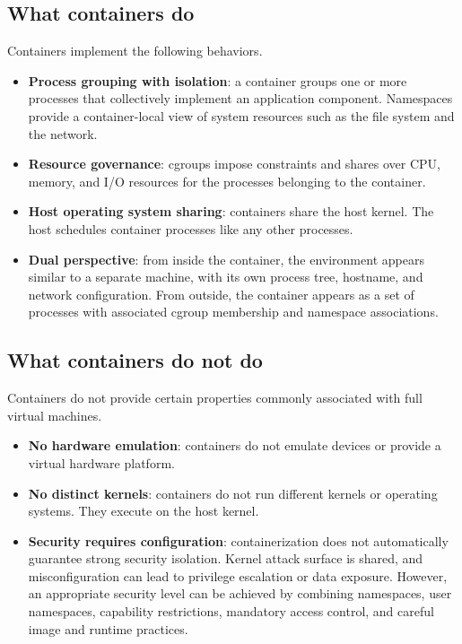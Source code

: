 \documentclass[11pt,a4paper,openany]{report}
\begin{document}
\subsection{What containers do}

Containers implement the following behaviors.

\begin{itemize}
\item \textbf{Process grouping with isolation}: a container groups one or more processes that collectively implement an application component. Namespaces provide a container-local view of system resources such as the file system and the network.
\item \textbf{Resource governance}: cgroups impose constraints and shares over CPU, memory, and I/O resources for the processes belonging to the container.
\item \textbf{Host operating system sharing}: containers share the host kernel. The host schedules container processes like any other processes.
\item \textbf{Dual perspective}: from inside the container, the environment appears similar to a separate machine, with its own process tree, hostname, and network configuration. From outside, the container appears as a set of processes with associated cgroup membership and namespace associations.
\end{itemize}

\subsection{What containers do not do}

Containers do not provide certain properties commonly associated with full virtual machines.

\begin{itemize}
\item \textbf{No hardware emulation}: containers do not emulate devices or provide a virtual hardware platform.
\item \textbf{No distinct kernels}: containers do not run different kernels or operating systems. They execute on the host kernel.
\item \textbf{Security requires configuration}: containerization does not automatically guarantee strong security isolation. Kernel attack surface is shared, and misconfiguration can lead to privilege escalation or data exposure. However, an appropriate security level can be achieved by combining namespaces, user namespaces, capability restrictions, mandatory access control, and careful image and runtime practices.
\end{itemize}
\end{document}
